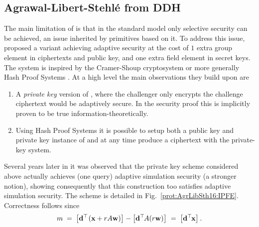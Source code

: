 
\subsection{Agrawal-Libert-Stehl\'{e} from DDH}

The main limitation of \cite{PKC:ABDP15} is that in the standard model only selective security can be achieved, an issue inherited by primitives based on it.
To address this issue, \cite{C:AgrLibSte16} proposed a variant achieving adaptive security at the cost of $1$ extra group element in ciphertexts and public key, and one extra field element in secret keys.
The system is inspired by the Cramer-Shoup cryptosystem \cite{C:CraSho98} or more generally Hash Proof Systems \cite{EC:CraSho02}.
At a high level the main observations they build upon are
\begin{enumerate}
	\item A \textit{private key} version of \cite{PKC:ABDP15}, where the challenger only encrypts the challenge ciphertext would be adaptively secure.
	In the security proof this is implicitly proven to be true information-theoretically.
	
	\item Using Hash Proof Systems it is possible to setup both a public key and private key instance of \cite{PKC:ABDP15} and at any time produce a ciphertext with the private-key system.
\end{enumerate}

Several years later in \cite{PKC:ALMT20} it was observed that the private key scheme considered above actually achieves (one query) adaptive simulation security (a stronger notion), showing consequently that this construction too satisfies adaptive simulation security.
The scheme is detailed in Fig.~\ref{prot:AgrLibSth16:IPFE}.
Correctness follows since
\[
	m
		\; = \;
 	\left[{\mathbf{d}^\top\hspace{-.1em} \left(\mathbf{x} + rA \mathbf{w} \right)}\right]_{}
 		-
 	\left[{\mathbf{d}^\top\hspace{-.1em} A (r\mathbf{w})}\right]_{}
 		\; = \;
 	\left[{\mathbf{d}^\top\hspace{-.1em}\mathbf{x}}\right]_{}.
\]


